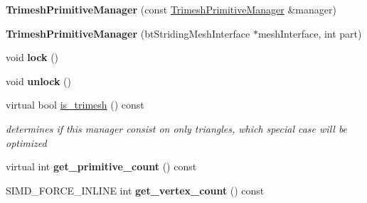 \begin{DoxyCompactItemize}
\item 
\mbox{\label{classbtGImpactMeshShapePart_1_1TrimeshPrimitiveManager_ac2132d17cd0eaab2deee81783492ea34}} 
{\bfseries Trimesh\+Primitive\+Manager} (const \hyperlink{classbtGImpactMeshShapePart_1_1TrimeshPrimitiveManager}{Trimesh\+Primitive\+Manager} \&manager)
\item 
\mbox{\label{classbtGImpactMeshShapePart_1_1TrimeshPrimitiveManager_a2e8cb2bb12d4a52d99f10afbb2a5c06f}} 
{\bfseries Trimesh\+Primitive\+Manager} (bt\+Striding\+Mesh\+Interface $\ast$mesh\+Interface, int part)
\item 
\mbox{\label{classbtGImpactMeshShapePart_1_1TrimeshPrimitiveManager_a48a013e72b76f832638a54326a7cc709}} 
void {\bfseries lock} ()
\item 
\mbox{\label{classbtGImpactMeshShapePart_1_1TrimeshPrimitiveManager_aaa44d0463dfc7e66e203ede074db17ed}} 
void {\bfseries unlock} ()
\item 
\mbox{\label{classbtGImpactMeshShapePart_1_1TrimeshPrimitiveManager_ab6653df67e4563e23a15528916826375}} 
virtual bool \hyperlink{classbtGImpactMeshShapePart_1_1TrimeshPrimitiveManager_ab6653df67e4563e23a15528916826375}{is\+\_\+trimesh} () const
\begin{DoxyCompactList}\small\item\em determines if this manager consist on only triangles, which special case will be optimized \end{DoxyCompactList}\item 
\mbox{\label{classbtGImpactMeshShapePart_1_1TrimeshPrimitiveManager_a3dd197e6b8d45058edbec0a974fa2dfc}} 
virtual int {\bfseries get\+\_\+primitive\+\_\+count} () const
\item 
\mbox{\label{classbtGImpactMeshShapePart_1_1TrimeshPrimitiveManager_a25388a6fc8303ae40c4442287c540b5e}} 
S\+I\+M\+D\+\_\+\+F\+O\+R\+C\+E\+\_\+\+I\+N\+L\+I\+NE int {\bfseries get\+\_\+vertex\+\_\+count} () const

\end{DoxyCompactItemize}
